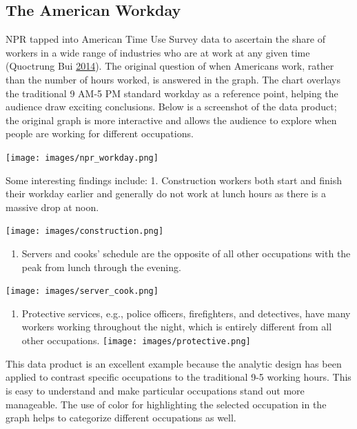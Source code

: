 \documentclass[]{book}
\providecommand{\tightlist}{%
  \setlength{\itemsep}{0pt}\setlength{\parskip}{0pt}}
\begin{document}
\hypertarget{the-american-workday}{%
\subsection{The American Workday}\label{the-american-workday}}

NPR tapped into American Time Use Survey data to ascertain the share of workers in a wide range of industries who are at work at any given time (Quoctrung Bui \protect\hyperlink{ref-NPR_workday}{2014}). The original question of when Americans work, rather than the number of hours worked, is answered in the graph. The chart overlays the traditional 9 AM-5 PM standard workday as a reference point, helping the audience draw exciting conclusions. Below is a screenshot of the data product; the original graph is more interactive and allows the audience to explore when people are working for different occupations.

\texttt{[image: images/npr\_workday.png]}

Some interesting findings include:
1. Construction workers both start and finish their workday earlier and generally do not work at lunch hours as there is a massive drop at noon.

\texttt{[image: images/construction.png]}

\begin{enumerate}
\def\labelenumi{\arabic{enumi}.}
\setcounter{enumi}{1}
\tightlist
\item
  Servers and cooks' schedule are the opposite of all other occupations with the peak from lunch through the evening.
\end{enumerate}

\texttt{[image: images/server\_cook.png]}

\begin{enumerate}
\def\labelenumi{\arabic{enumi}.}
\setcounter{enumi}{2}
\tightlist
\item
  Protective services, e.g., police officers, firefighters, and detectives, have many workers working throughout the night, which is entirely different from all other occupations.
  \texttt{[image: images/protective.png]}
\end{enumerate}

This data product is an excellent example because the analytic design has been applied to contrast specific occupations to the traditional 9-5 working hours. This is easy to understand and make particular occupations stand out more manageable. The use of color for highlighting the selected occupation in the graph helps to categorize different occupations as well.
\end{document}
